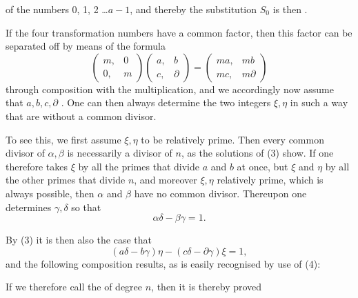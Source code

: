 of the numbers 0, 1, 2 \dots $a - 1$, and thereby the substitution
$S_0$ is then .

If the four transformation numbers have a common factor, then
this factor can be separated off by means of the formula
\[
\begin{pmatrix}m, & 0\\0, & m\end{pmatrix}\begin{pmatrix}a, & b\\c, & \partial\end{pmatrix} = \begin{pmatrix}ma, & mb\\mc, & m\partial\end{pmatrix}
\]
through composition with the multiplication, and we accordingly
now assume that $a, b, c, \partial$ . One can then always determine the two
integers $\xi, \eta$ in such a way that
are without a common divisor.

To see this, we first assume $\xi, \eta$ to be relatively prime.
Then every common divisor of $\alpha, \beta$ is necessarily a
divisor of $n$, as the solutions of (3)
show. If one therefore takes $\xi$  by all the primes
that divide $a$ and $b$ at once, but $\xi$  and
$\eta$  by all the other primes that divide $n$,
and moreover $\xi, \eta$ relatively prime, which is always possible, then
$\alpha$ and $\beta$ have no common divisor. Thereupon one determines $\gamma, \delta$
so that
\[
\alpha\delta - \beta\gamma = 1.
\]

By (3) it is then also the case that
\[
(a\delta - b\gamma)\eta - (c\delta - \partial\gamma)\xi = 1,
\]
and the following composition results, as is easily recognised by
use of (4):

If we therefore call
the  of degree $n$, then it is thereby proved
